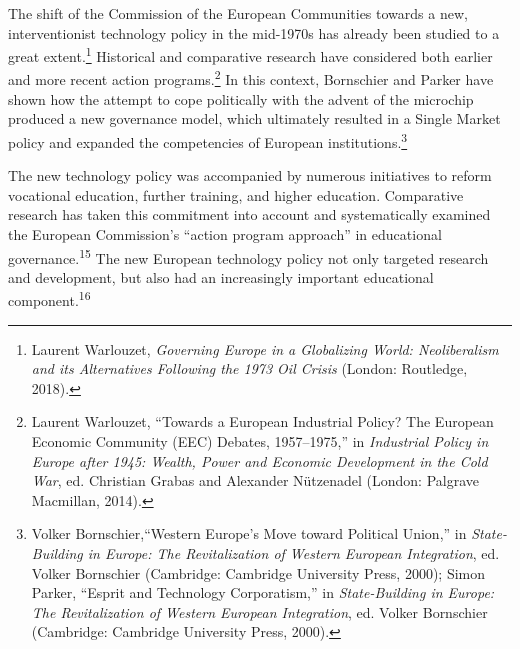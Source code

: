 \documentclass{tufte-handout}
\begin{document}
The shift of the Commission of the European Communities towards a new,
interventionist technology policy in the mid-1970s has already been
studied to a great extent.\footnote{Laurent Warlouzet, \emph{Governing
  Europe in a Globalizing World: Neoliberalism and its Alternatives
  Following the 1973 Oil Crisis} (London: Routledge, 2018).} Historical
and comparative research have considered both earlier and more recent
action programs.\footnote{Laurent Warlouzet, ``Towards a European
  Industrial Policy? The European Economic Community (EEC) Debates,
  1957--1975,'' in \emph{Industrial Policy in Europe after 1945: Wealth,
  Power and Economic Development in the Cold War}, ed. Christian Grabas
  and Alexander Nützenadel (London: Palgrave Macmillan, 2014).} In this
context, Bornschier and Parker have shown how the attempt to cope
politically with the advent of the microchip produced a new governance
model, which ultimately resulted in a Single Market policy and expanded
the competencies of European institutions.\footnote{Volker
  Bornschier,``Western Europe's Move toward Political Union,'' in
  \emph{State-Building in Europe: The Revitalization of Western European
  Integration}, ed. Volker Bornschier (Cambridge: Cambridge University
  Press, 2000); Simon Parker, ``Esprit and Technology Corporatism,'' in
  \emph{State-Building in Europe: The Revitalization of Western European
  Integration}, ed. Volker Bornschier (Cambridge: Cambridge University
  Press, 2000).}

The new technology policy was accompanied by numerous initiatives to
reform vocational education, further training, and higher education.
Comparative research has taken this commitment into account and
systematically examined the European Commission's ``action program
approach'' in educational governance.\textsuperscript{15} The new European technology policy not
only targeted research and development, but also had an increasingly
important educational component.\textsuperscript{16}
\end{document}
